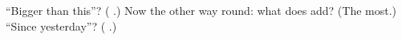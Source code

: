 \begin{tcolorbox}[breakable,colback=teal!4,colframe=teal!35!black,title={Before you move on}]
\textquotedblleft{}Bigger than this\textquotedblright{}? (\textbf{  }.) Now the other way round: what does \textbf{ } add? (The most.) \textquotedblleft{}Since yesterday\textquotedblright{}? (\textbf{ }.)
\end{tcolorbox}
